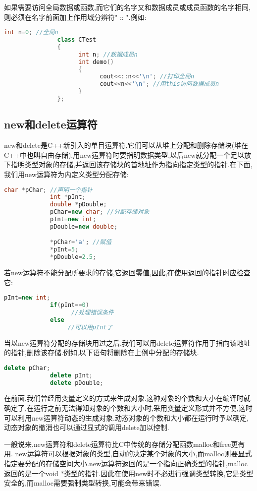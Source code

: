 \documentclass{article}
\begin{document}
如果需要访问全局数据或函数,而它们的名字又和数据成员或成员函数的名字相同,则必须在名字前面加上作用域分辨符" :: ".例如:
\begin{lstlisting}[language=c++]
               int n=0; //全局n
               class CTest
               {
                     int n; //数据成员n
                     int demo()
                     {
                           cout<<::n<<'\n'; //打印全局n
                           cout<<n<<'\n'; //用this访问数据成员n
                     }
               };

\end{lstlisting}
\subsection{new和delete运算符}
\label{sec-2-2}
new和delete是C++新引入的单目运算符,它们可以从堆上分配和删除存储块(堆在C++中也叫自由存储).用new运算符时要指明数据类型,以后new就分配一个足以放下指明类型对象的存储,并返回该存储块的首地址作为指向指定类型的指针.在下面,我们用new运算符为内定义类型分配存储:
\begin{lstlisting}[language=c++]
             char *pChar; //声明一个指针
             int *pInt;
             double *pDouble;
             pChar=new char; //分配存储对象
             pInt=new int;
             pDouble=new double;

             *pChar='a'; //赋值
             *pInt=5;
             *pDouble=2.5;
\end{lstlisting}
若new运算符不能分配所要求的存储,它返回零值,因此,在使用返回的指针时应检查它:
\begin{lstlisting}[language=c++]
             pInt=new int;
             if(pInt==0)
                   //处理错误条件
             else
                  //可以用pInt了
\end{lstlisting}
当以new运算符分配的存储块用过之后,我们可以用delete运算符作用于指向该地址的指针,删除该存储.例如,以下语句将删除在上例中分配的存储块.
\begin{lstlisting}[language=c++]
             delete pChar;
             delete pInt;
             delete pDouble;
\end{lstlisting}
在前面,我们曾经用变量定义的方式来生成对象.这种对象的个数和大小在编译时就确定了,在运行之前无法得知对象的个数和大小时,采用变量定义形式并不方便,这时可以利用new运算符动态的生成对象.动态对象的个数和大小都在运行时予以确定,动态对象的撤消也可以通过显式的调用delete加以控制.

一般说来,new运算符和delete运算符比C中传统的存储分配函数malloc和free更有用. new运算符可以根据对象的类型,自动的决定某个对象的大小,而malloc则要显式指定要分配的存储空间大小.new运算符返回的是一个指向正确类型的指针,malloc返回的是一个void *类型的指针.因此在使用new时不必进行强调类型转换,它是类型安全的,而malloc需要强制类型转换,可能会带来错误.
\end{document}
